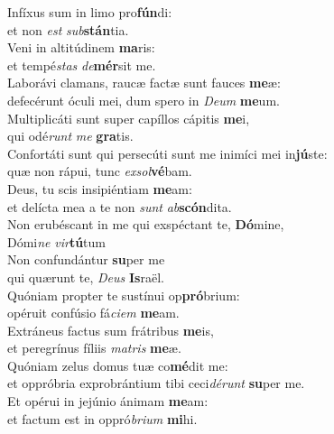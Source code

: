 \evenverse Infíxus sum in limo pro\textbf{fún}di:~\*\\
\evenverse et non \textit{est} \textit{sub}\textbf{stán}tia.\\
\oddverse Veni in altitúdinem \textbf{ma}ris:~\*\\
\oddverse et tempé\textit{stas} \textit{de}\textbf{mér}sit me.\\
\evenverse Laborávi clamans, raucæ factæ sunt fauces \textbf{me}æ:~\*\\
\evenverse defecérunt óculi mei, dum spero in \textit{De}\textit{um} \textbf{me}um.\\
\oddverse Multiplicáti sunt super capíllos cápitis \textbf{me}i,~\*\\
\oddverse qui odé\textit{runt} \textit{me} \textbf{gra}tis.\\
\evenverse Confortáti sunt qui persecúti sunt me inimíci mei in\textbf{jú}ste:~\*\\
\evenverse quæ non rápui, tunc \textit{ex}\textit{sol}\textbf{vé}bam.\\
\oddverse Deus, tu scis insipiéntiam \textbf{me}am:~\*\\
\oddverse et delícta mea a te non \textit{sunt} \textit{ab}\textbf{scón}dita.\\
\evenverse Non erubéscant in me qui exspéctant te, \textbf{Dó}mine,~\*\\
\evenverse Dómi\textit{ne} \textit{vir}\textbf{tú}tum\\
\oddverse Non confundántur \textbf{su}per me~\*\\
\oddverse qui quærunt te, \textit{De}\textit{us} \textbf{Is}raël.\\
\evenverse Quóniam propter te sustínui op\textbf{pró}brium:~\*\\
\evenverse opéruit confúsio fá\textit{ci}\textit{em} \textbf{me}am.\\
\oddverse Extráneus factus sum frátribus \textbf{me}is,~\*\\
\oddverse et peregrínus fíliis \textit{ma}\textit{tris} \textbf{me}æ.\\
\evenverse Quóniam zelus domus tuæ co\textbf{mé}dit me:~\*\\
\evenverse et oppróbria exprobrántium tibi ceci\textit{dé}\textit{runt} \textbf{su}per me.\\
\oddverse Et opérui in jejúnio ánimam \textbf{me}am:~\*\\
\oddverse et factum est in oppró\textit{bri}\textit{um} \textbf{mi}hi.\\
